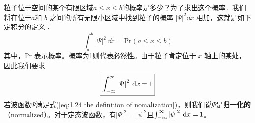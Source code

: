 	粒子位于空间的某个有限区域$a \le x \le b$的概率是多少？为了求出这个概率，我们将在位于$a$和 $b$ 之间的所有无限小区域中找到粒子的概率 $\left|\Psi\right|^2\dd x$ 相加，这就是如下定积分的定义：
	\begin{equation}
		\boxed{\int_{a}^{b}\left|\Psi\right|^2 \:\dd x = \text{Pr}\left(a \le x \le b\right)}
		\label{eq:1.23 int of probability}
	\end{equation}
	其中，Pr 表示概率。概率为1则代表必然性。由于粒子肯定位于 $x$ 轴上的某处，因此我们要求
	\begin{equation}
		\boxed{\int_{-\infty}^{\infty} \left|\Psi\right|^2 \:\dd x = 1}
		\label{eq:1.24 the definition of nomalization}
	\end{equation}
	若波函数$\Psi$满足式(\ref{eq:1.24 the definition of nomalization})，则我们说$\Psi$是\textbf{归一化的}（normalized）。对于定态波函数，有$\left|\Psi\right|^2 = \left|\psi\right|^2$且$\int_{-\infty}^{\infty} \left|\psi\right|^2 \:\dd x = 1$。

